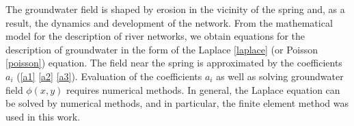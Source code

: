 \documentclass[]{pracamgr}
\begin{document}
    \hspace{1em} 
    The groundwater field is shaped by erosion in the vicinity of the spring and, as a result, the dynamics and development of the network. From the mathematical model for the description of river networks, we obtain equations for the description of groundwater in the form of the Laplace \ref{laplace} (or Poisson \ref{poisson}) equation. The field near the spring is approximated by the coefficients $a_i$ (\ref{a1} \ref{a2} \ref{a3}). Evaluation of the coefficients $a_i$ as well as solving groundwater field $\phi(x, y)$ requires numerical methods. In general, the Laplace equation can be solved by numerical methods, and in particular, the finite element method was used in this work. \\ \indent
    
\end{document}
